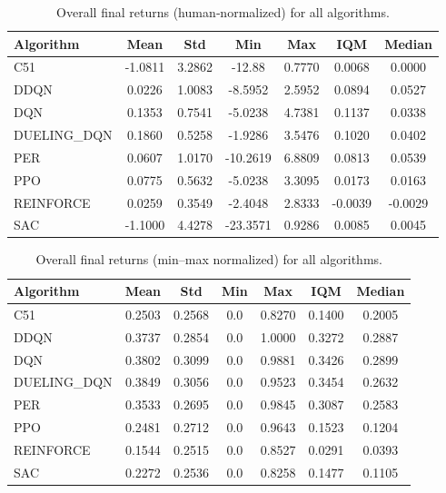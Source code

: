 \begin{table} 
	\centering
	\caption{Overall final returns (human‐normalized) for all algorithms.}
	\label{tab:all_algo_eval_human}
	\begin{tabular}{lcccccc}
		\toprule
		\textbf{Algorithm} & \textbf{Mean} & \textbf{Std} & \textbf{Min} & \textbf{Max} & \textbf{IQM} & \textbf{Median} \\
		\midrule
		C51       & -1.0811 & 3.2862 & -12.88 & 0.7770 & 0.0068 & 0.0000 \\
		DDQN      & 0.0226  & 1.0083 & -8.5952 & 2.5952 & 0.0894 & 0.0527 \\
		DQN       & 0.1353  & 0.7541 & -5.0238 & 4.7381 & 0.1137 & 0.0338 \\
		DUELING\_DQN & 0.1860  & 0.5258 & -1.9286 & 3.5476 & 0.1020 & 0.0402 \\
		PER       & 0.0607  & 1.0170 & -10.2619 & 6.8809 & 0.0813 & 0.0539 \\
		PPO       & 0.0775  & 0.5632 & -5.0238 & 3.3095 & 0.0173 & 0.0163 \\
		REINFORCE & 0.0259  & 0.3549 & -2.4048 & 2.8333 & -0.0039 & -0.0029 \\
		SAC       & -1.1000 & 4.4278 & -23.3571 & 0.9286 & 0.0085 & 0.0045 \\
		\bottomrule
	\end{tabular}
\end{table}

\begin{table} 
	\centering
	\caption{Overall final returns (min--max normalized) for all algorithms.}
	\label{tab:all_algo_eval_minmax}
	\begin{tabular}{lcccccc}
		\toprule
		\textbf{Algorithm} & \textbf{Mean} & \textbf{Std} & \textbf{Min} & \textbf{Max} & \textbf{IQM} & \textbf{Median} \\
		\midrule
		C51       & 0.2503 & 0.2568 & 0.0 & 0.8270 & 0.1400 & 0.2005 \\
		DDQN      & 0.3737 & 0.2854 & 0.0 & 1.0000 & 0.3272 & 0.2887 \\
		DQN       & 0.3802 & 0.3099 & 0.0 & 0.9881 & 0.3426 & 0.2899 \\
		DUELING\_DQN & 0.3849 & 0.3056 & 0.0 & 0.9523 & 0.3454 & 0.2632 \\
		PER       & 0.3533 & 0.2695 & 0.0 & 0.9845 & 0.3087 & 0.2583 \\
		PPO       & 0.2481 & 0.2712 & 0.0 & 0.9643 & 0.1523 & 0.1204 \\
		REINFORCE & 0.1544 & 0.2515 & 0.0 & 0.8527 & 0.0291 & 0.0393 \\
		SAC       & 0.2272 & 0.2536 & 0.0 & 0.8258 & 0.1477 & 0.1105 \\
		\bottomrule
	\end{tabular}
\end{table}

